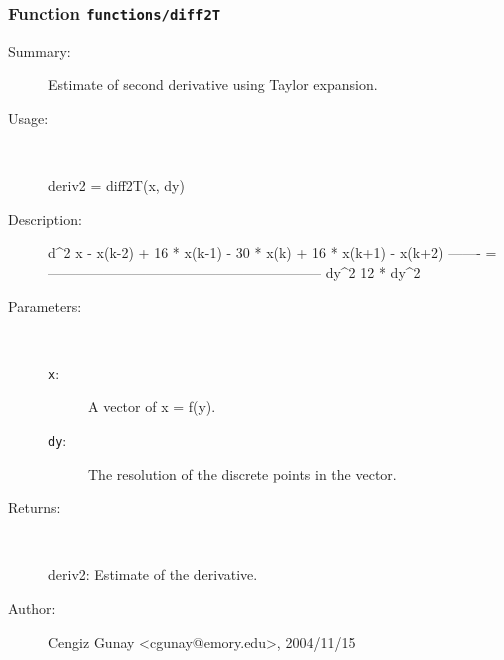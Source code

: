\subsubsection[Function \texttt{diff2T}]{Function \texttt{functions/diff2T}}%
%
\label{ref_functions__diff2T}%
\hypertarget{ref_functions__diff2T}{}%
\begin{description}
\item[Summary:]Estimate of second derivative using Taylor expansion.
%
\item[Usage:]~%
\begin{lyxcode}%
deriv2 = diff2T(x, dy)
%
\end{lyxcode}%
%
\item[Description:]%
d\textasciicircum{}2 x     - x(k-2) + 16 * x(k-1) - 30 * x(k) + 16 * x(k+1) - x(k+2)
  ------- = -----------------------------------------------------------
   dy\textasciicircum{}2			        12 * dy\textasciicircum{}2
\item[Parameters:]~
\begin{description}%
\item[\texttt{x}:]
 A vector of x = f(y).
\item[\texttt{dy}:]
 The resolution of the discrete points in the vector.
\end{description}%
%
\item[Returns:
]~

 	deriv2: Estimate of the derivative.
%
%
%
\item[Author:]%
Cengiz Gunay <cgunay@emory.edu>, 2004/11/15
%
\end{description}
\methodline%
